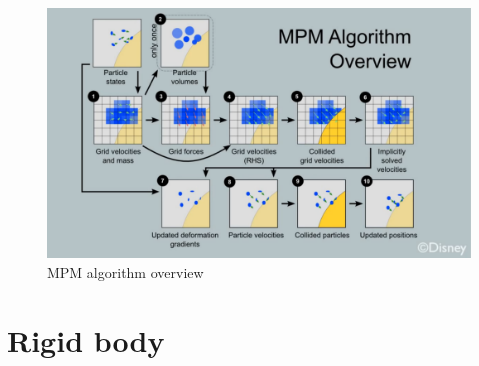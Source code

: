 \begin{itemize}
\begin{figure}[h!]
\label{mpm}
\includegraphics[width=\textwidth]{img/MPM}
\caption{MPM algorithm overview}
\end{figure}

\section{Rigid body}


\end{itemize}

